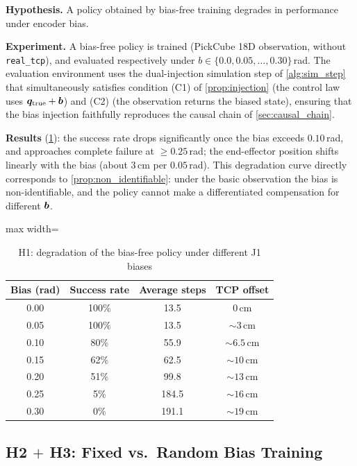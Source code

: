 \textbf{Hypothesis.} A policy obtained by bias-free training degrades in performance under encoder bias.

\textbf{Experiment.} A bias-free policy is trained (PickCube 18D observation, without \texttt{real\_tcp}), and evaluated respectively under $b \in \{0.0, 0.05, \ldots, 0.30\}$\,rad. The evaluation environment uses the dual-injection simulation step of \cref{alg:sim_step} that simultaneously satisfies condition (C1) of \cref{prop:injection} (the control law uses $\bm{q}_\text{true}+\bm{b}$) and (C2) (the observation returns the biased state), ensuring that the bias injection faithfully reproduces the causal chain of \cref{sec:causal_chain}.

\textbf{Results} (\cref{tab:h1_degradation}): the success rate drops significantly once the bias exceeds $0.10$\,rad, and approaches complete failure at $\geq 0.25$\,rad; the end-effector position shifts linearly with the bias (about $3$\,cm per $0.05$\,rad). This degradation curve directly corresponds to \cref{prop:non_identifiable}: under the basic observation the bias is non-identifiable, and the policy cannot make a differentiated compensation for different $\bm{b}$.

\begin{table}[htbp]
  \centering
  \caption{H1: degradation of the bias-free policy under different J1 biases}
  \label{tab:h1_degradation}
  \footnotesize
  \begin{adjustbox}{max width=\textwidth}
  \begin{tabular}{@{}cccc@{}}
    \toprule
    Bias (rad) & Success rate & Average steps & TCP offset \\
    \midrule
    0.00 & 100\% & 13.5 & 0\,cm \\
    0.05 & 100\% & 13.5 & $\sim 3$\,cm \\
    0.10 & 80\%  & 55.9 & $\sim 6.5$\,cm \\
    0.15 & 62\%  & 62.5 & $\sim 10$\,cm \\
    0.20 & 51\%  & 99.8 & $\sim 13$\,cm \\
    0.25 & 5\%   & 184.5 & $\sim 16$\,cm \\
    0.30 & 0\%   & 191.1 & $\sim 19$\,cm \\
    \bottomrule
  \end{tabular}
  \end{adjustbox}
\end{table}

\subsection{H2 $+$ H3: Fixed vs.\ Random Bias Training}\label{sec:exp_h2}

